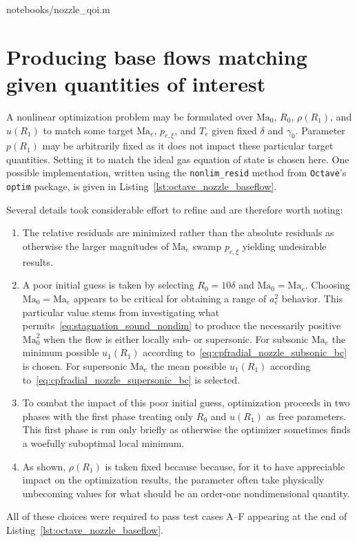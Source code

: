 \documentclass[letterpaper,11pt,nointlimits,reqno]{amsart}
\makeatletter
\newcommand{\Mach}[1][]{\mbox{Ma}_{#1}}
\newcommand\mynobreakpar{\par\nobreak\@afterheading}
\makeatother
\begin{document}

                {notebooks/nozzle_qoi.m}

\pagebreak[4]{}

\section{Producing base flows matching given quantities of interest}

A nonlinear optimization problem may be formulated over $\Mach[0]$, $R_0$,
$\rho\!\left(R_1\right)$, and $u\!\left(R_1\right)$ to match some target
$\Mach[e]{}$, $p_{e,\xi}$, and $T_e$ given fixed $\delta$ and $\gamma_0$.
Parameter $p\!\left(R_1\right)$ may be arbitrarily fixed as it does not impact
these particular target quantities.  Setting it to match the ideal gas equation
of state is chosen here.  One possible implementation, written using the
\texttt{nonlim\_resid} method from \texttt{Octave}'s \texttt{optim} package, is
given in Listing~\ref{lst:octave_nozzle_baseflow}.

Several details took considerable effort to refine and are therefore worth
noting:\mynobreakpar
\begin{enumerate}
  \item The relative residuals are minimized rather than the absolute residuals
    as otherwise the larger magnitudes of $\Mach[e]{}$ swamp $p_{e,\xi}$
    yielding undesirable results.
  \item A poor initial guess is taken by selecting $R_0 = 10\delta$ and
    $\Mach[0]{}=\Mach[e]{}$.  Choosing $\Mach[0]{}=\Mach[e]{}$ appears to be
    critical for obtaining a range of $a_e^2$ behavior.  This particular value
    stems from investigating what permits~\eqref{eq:stagnation_sound_nondim} to
    produce the necessarily positive $\Mach[0]^2$ when the flow is either
    locally sub- or supersonic.  For subsonic $\Mach[e]{}$ the minimum possible
    $u_1\!\left(R_1\right)$ according
    to~\eqref{eq:cpfradial_nozzle_subsonic_bc} is chosen.  For supersonic
    $\Mach[e]{}$ the mean possible $u_1\!\left(R_1\right)$ according
    to~\eqref{eq:cpfradial_nozzle_supersonic_bc} is selected.
  \item To combat the impact of this poor initial guess, optimization proceeds
    in two phases with the first phase treating only $R_0$ and
    $u\!\left(R_1\right)$ as free parameters.  This first phase is run only
    briefly as otherwise the optimizer sometimes finds a woefully suboptimal
    local minimum.
  \item As shown, $\rho\!\left(R_1\right)$ is taken fixed because because, for
    it to have appreciable impact on the optimization results, the parameter
    often take physically unbecoming values for what should be an order-one
    nondimensional quantity.
\end{enumerate}
All of these choices were required to pass test cases A--F appearing at the end
of Listing~\ref{lst:octave_nozzle_baseflow}.
\end{document}
